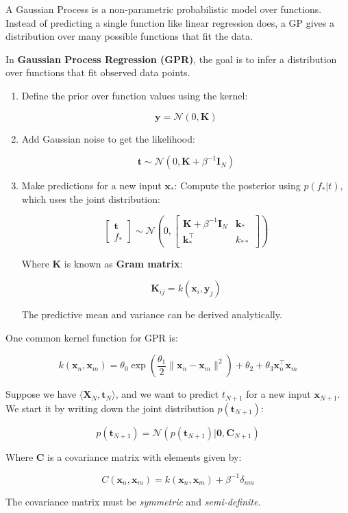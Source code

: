 A Gaussian Process is a non-parametric probabilistic model over functions.
Instead of predicting a single function like linear regression does, a GP gives a distribution over many possible functions that fit the data.

In \textbf{Gaussian Process Regression (GPR)}, the goal is to infer a distribution over functions that fit observed data points.

\begin{enumerate}
    \item {
        Define the prior over function values using the kernel:

        \[
            \bm{y} = \mathcal{N}(0, \bm{K})
        \]
    }
    \item {
        Add Gaussian noise to get the likelihood:

        \[
            \bm{t} \sim \mathcal{N}(0, \bm{K} + \beta^{-1}\bm{I}_N)
        \]
    }
    \item {
        Make predictions for a new input $\bm{x}_*$:
        Compute the posterior using $p(f_* | t)$, which uses the joint distribution:

        \[
            \begin{bmatrix}
                \bm{t} \\ f_*
            \end{bmatrix}
            \sim
            \mathcal{N}\left(0, \begin{bmatrix}
                                    \mathbf{K} + \beta^{-1}\bm{I}_N & \bm{k}_* \\
                                    \bm{k}_*^\top                   & k_{**}
            \end{bmatrix}\right)
        \]

        Where $\bm{K}$ is known as \textbf{Gram matrix}:

        \[
            \bm{K}_{ij} = k(\bm{x}_i, \bm{y}_j)
        \]

        The predictive mean and variance can be derived analytically.
    }
\end{enumerate}

One common kernel function for GPR is:

\[
    k(\bm{x}_n, \bm{x}_m) = \theta_0 \exp \left( \frac{\theta_1}{2} \lVert \bm{x}_n - \bm{x}_m \rVert^2 \right) + \theta_2 + \theta_3 \bm{x}_n^{\top}\bm{x}_m
\]

Suppose we have $\langle \bm{X}_N, \bm{t}_N \rangle$, and we want to predict $t_{N+1}$ for a new input $\bm{x}_{N+1}$.
We start it by writing down the joint distribution $p(\bm{t}_{N+1})$:

\[
    p(\bm{t}_{N+1}) = \mathcal{N}(p(\bm{t}_{N+1}) | \bm{0}, \bm{C}_{N+1})
\]

Where $\bm{C}$ is a covariance matrix with elements given by:

\[
    C(\bm{x}_n, \bm{x}_m) = k(\bm{x}_n, \bm{x}_m) + \beta^{-1}\delta_{nm}
\]

The covariance matrix must be \textit{symmetric} and \textit{semi-definite}.
